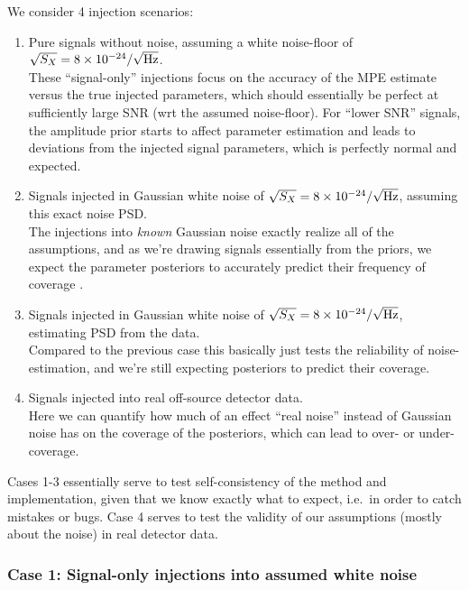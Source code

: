 \documentclass[aps,prd,onecolumn,notitlepage,nofootinbib,superscriptaddress,altaffilletter,floatfix]{revtex4-1}
\begin{document}
We consider 4 injection scenarios:
\begin{enumerate}

\item Pure signals without noise, assuming a white noise-floor of $\sqrt{S_X} = 8\times10^{-24}/\sqrt{\mathrm{Hz}}$.\\[0.2cm]
  These ``signal-only'' injections focus on the accuracy of the MPE estimate versus the true injected parameters, which should essentially be
  perfect at sufficiently large SNR (wrt the assumed noise-floor). For ``lower SNR'' signals, the amplitude prior starts to affect parameter estimation
  and leads to deviations from the injected signal parameters, which is perfectly normal and expected.

\item Signals injected in Gaussian white noise of $\sqrt{S_X} = 8\times10^{-24}/\sqrt{\mathrm{Hz}}$, assuming this exact noise PSD.\\[0.2cm]
  The injections into \emph{known} Gaussian noise exactly realize all of the assumptions, and as we're drawing signals essentially from the
  priors, we expect the parameter posteriors to accurately predict their frequency of coverage \citep[e.g.\ see][]{2008arXiv0804.1161S}.

\item Signals injected in Gaussian white noise of $\sqrt{S_X} = 8\times10^{-24}/\sqrt{\mathrm{Hz}}$, estimating PSD from the data.\\[0.2cm]
  Compared to the previous case this basically just tests the reliability of noise-estimation, and we're still expecting posteriors to predict their
  coverage.

\item Signals injected into real off-source detector data.\\[0.2cm]
  Here we can quantify how much of an effect ``real noise'' instead of Gaussian noise has on the coverage of the posteriors, which can lead to over-
  or under-coverage.

\end{enumerate}

Cases 1-3 essentially serve to test self-consistency of the method and implementation, given that we know exactly what to expect, i.e.\ in order to
catch mistakes or bugs. Case 4 serves to test the validity of our assumptions (mostly about the noise) in real detector data.

\newpage
\subsubsection{Case 1: Signal-only injections into assumed white noise}
\label{sec:case-1:injections-signal-only}
\end{document}
